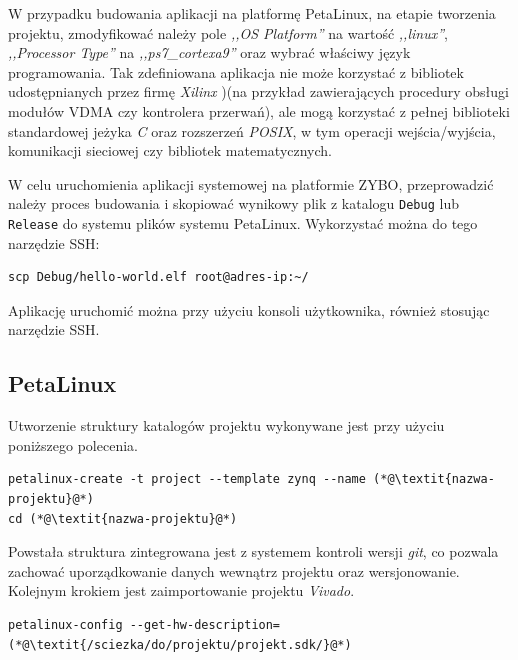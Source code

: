 W przypadku budowania aplikacji na platformę PetaLinux, na etapie tworzenia projektu, zmodyfikować należy pole \emph{,,OS Platform''} na wartość \emph{,,linux''}, \emph{,,Processor Type''} na \emph{,,ps7\_cortexa9''} oraz wybrać właściwy język programowania.
Tak zdefiniowana aplikacja nie może korzystać z bibliotek udostępnianych przez firmę \emph{Xilinx} )(na przykład zawierających procedury obsługi modułów VDMA czy kontrolera przerwań), ale mogą korzystać z pełnej biblioteki standardowej jeżyka \emph{C} oraz rozszerzeń \emph{POSIX}, w tym operacji wejścia/wyjścia, komunikacji sieciowej czy bibliotek matematycznych.

W celu uruchomienia aplikacji systemowej na platformie ZYBO, przeprowadzić należy proces budowania i skopiować wynikowy plik z katalogu \texttt{Debug} lub \texttt{Release} do systemu plików systemu PetaLinux. 
Wykorzystać można do tego narzędzie SSH:

\begin{lstlisting}[breaklines=true]
scp Debug/hello-world.elf root@adres-ip:~/
\end{lstlisting}

Aplikację uruchomić można przy użyciu konsoli użytkownika, również stosując narzędzie SSH.

\subsection{PetaLinux}
\label{sec:petalinux-config}


Utworzenie struktury katalogów projektu wykonywane jest przy użyciu poniższego polecenia.

\begin{lstlisting}[breaklines=true]
petalinux-create -t project --template zynq --name (*@\textit{nazwa-projektu}@*)
cd (*@\textit{nazwa-projektu}@*)
\end{lstlisting}

Powstała struktura zintegrowana jest z systemem kontroli wersji \emph{git}, co pozwala zachować uporządkowanie danych wewnątrz projektu oraz wersjonowanie. 
Kolejnym krokiem jest zaimportowanie projektu \emph{Vivado}.

\begin{lstlisting}[breaklines=true]
petalinux-config --get-hw-description=(*@\textit{/sciezka/do/projektu/projekt.sdk/}@*)
\end{lstlisting}

